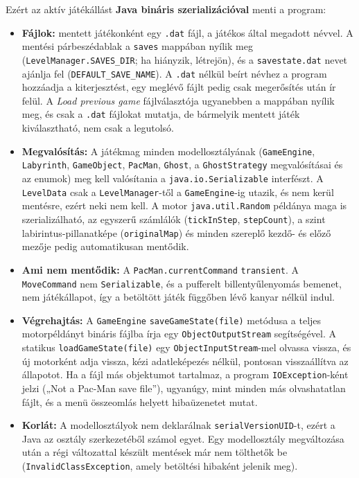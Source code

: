 \documentclass[11pt, a4paper]{article}
\begin{document}
Ezért az aktív játékállást \textbf{Java bináris szerializációval} menti a program:
\begin{itemize}
    \item \textbf{Fájlok:} mentett játékonként egy \texttt{.dat} fájl, a játékos által megadott névvel. A mentési párbeszédablak a \texttt{saves} mappában nyílik meg (\texttt{LevelManager.SAVES\_DIR}; ha hiányzik, létrejön), és a \texttt{savestate.dat} nevet ajánlja fel (\texttt{DEFAULT\_SAVE\_NAME}). A \texttt{.dat} nélkül beírt névhez a program hozzáadja a kiterjesztést, egy meglévő fájlt pedig csak megerősítés után ír felül. A \textit{Load previous game} fájlválasztója ugyanebben a mappában nyílik meg, és csak a \texttt{.dat} fájlokat mutatja, de bármelyik mentett játék kiválasztható, nem csak a legutolsó.
    \item \textbf{Megvalósítás:} A játékmag minden modellosztályának (\texttt{GameEngine}, \texttt{Labyrinth}, \texttt{GameObject}, \texttt{PacMan}, \texttt{Ghost}, a \texttt{GhostStrategy} megvalósításai és az enumok) meg kell valósítania a \texttt{java.io.Serializable} interfészt. A \texttt{LevelData} csak a \texttt{LevelManager}-től a \texttt{GameEngine}-ig utazik, és nem kerül mentésre, ezért neki nem kell. A motor \texttt{java.util.Random} példánya maga is szerializálható, az egyszerű számlálók (\texttt{tickInStep}, \texttt{stepCount}), a szint labirintus-pillanatképe (\texttt{originalMap}) és minden szereplő kezdő- és előző mezője pedig automatikusan mentődik.
    \item \textbf{Ami nem mentődik:} A \texttt{PacMan.currentCommand} \texttt{transient}. A \texttt{MoveCommand} nem \texttt{Serializable}, és a pufferelt billentyűlenyomás bemenet, nem játékállapot, így a betöltött játék függőben lévő kanyar nélkül indul.
    \item \textbf{Végrehajtás:} A \texttt{GameEngine} \texttt{saveGameState(file)} metódusa a teljes motorpéldányt bináris fájlba írja egy \texttt{ObjectOutputStream} segítségével. A statikus \texttt{loadGameState(file)} egy \texttt{ObjectInputStream}-mel olvassa vissza, és új motorként adja vissza, kézi adatleképezés nélkül, pontosan visszaállítva az állapotot. Ha a fájl más objektumot tartalmaz, a program \texttt{IOException}-ként jelzi („Not a Pac-Man save file”), ugyanúgy, mint minden más olvashatatlan fájlt, és a menü összeomlás helyett hibaüzenetet mutat.
    \item \textbf{Korlát:} A modellosztályok nem deklarálnak \texttt{serialVersionUID}-t, ezért a Java az osztály szerkezetéből számol egyet. Egy modellosztály megváltozása után a régi változattal készült mentések már nem tölthetők be (\texttt{InvalidClassException}, amely betöltési hibaként jelenik meg).
\end{itemize}
\end{document}
